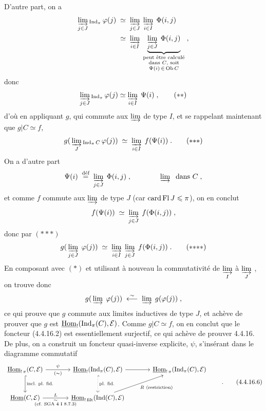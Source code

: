 D'autre part, on a
\[
\begin{aligned}
\varinjlim_{j\in J}{}_{\operatorname{Ind}_\pi}\,\varphi(j)\;&\simeq\;\varinjlim_{j\in J}\;\varinjlim_{i\in I}\;\Phi(i,j)\\
&\simeq\;\varinjlim_{i\in I}\;\underbrace{\varinjlim_{j\in J}\;\Phi(i,j)}_{\substack{\text{peut être calculé}\\ \text{dans $C$, soit}\\ \Psi(i)\,\in\,\mathrm{Ob}\, C}}\;,
\end{aligned}
\]
donc
\[
\varinjlim_{j\in J}{}_{\Ind_\pi}\,\varphi(j)\simeq\varinjlim_{i\in I}\;\Psi(i)\;, \tag*{$(**)$}
\]
d'où en appliquant $g$, qui commute aux $\varinjlim$ de type $I$, et se rappelant maintenant que $g|C\simeq f$,
\[
g(\,\varinjlim_{J}{}_{\Ind_\pi C}\,\varphi(j))\;\simeq\;\varinjlim_{i\in I}\;f(\Psi(i))\;. \tag*{$(*{*}*)$}
\]
On a d'autre part
\[
\Psi(i)\;\overset{\text{déf}}{=}\;\varinjlim_{j\in J}\;\Phi(i,j)\;,\qquad\qquad \varinjlim\;\text{ dans } C\;,
\]
et comme $f$ commute aux $\varinjlim$ de type $J$ (car $\operatorname{card}\operatorname{Fl} J\leqslant\pi$), on en conclut
\[
f(\Psi(i))\;\simeq\;\varinjlim_{j\in J}\;f(\Phi(i,j))\;,
\]
donc par $(*{*}*)$
\[
g(\,\varinjlim_{j\in J}\;\varphi(j))\;\simeq\;\varinjlim_{i\in I}\;\varinjlim_{j\in J}\;f(\Phi(i,j))\;. \tag*{$(*{*}{*}*)$}
\]
En composant avec $(*)$ et utilisant à nouveau la commutativité de $\varinjlim\limits_{I}$ à $\varinjlim\limits_{J}$ , on trouve donc
\[
g(\,\varinjlim\;\varphi(j))\;\overset{\sim}{\longleftarrow}\;\varinjlim\;g(\varphi(j))\;,
\]
ce qui prouve que $g$ commute aux limites inductives de type $J$, et achève de prouver que $g$ est $\underline{\mathrm{Hom}}_{!}(\operatorname{Ind}_\pi(C),\mathcal{E})$. Comme $g|C\simeq f$, on en conclut que le foncteur (4.4.16.2) est essentiellement surjectif, ce qui achève de prouver 4.4.16. De plus, on a construit un foncteur quasi-inverse explicite, $\psi$,
s'insérant dans le diagramme commutatif
\[
\begin{tikzcd}[column sep=large, row sep=large]
\uHom_{!\,\pi}(C,\mathcal{E}) \arrow[r, "\psi", "(\sim)"'] \arrow[d, hook, "\text{incl. pl. fid.}"] & \uHom_{!}(\Ind_\pi(C),\mathcal{E}) \arrow[r] \arrow[d, hook, dotted, "\text{pl. fid.}"] & \uHom_{!\,\pi}(\Ind_\pi(C),\mathcal{E}) \\
\uHom(C,\mathcal{E}) \arrow[r, "L", "\substack{\sim\\ \text{(cf. SGA 4 I 8.7.3)}}"'] & \uHom_{!\,\mathrm{filt}}(\Ind(C),\mathcal{E}) \arrow[ur, "R\ \text{(restriction)}"'] &
\end{tikzcd}
\qquad.
\tag*{(4.4.16.6)} %
\]

